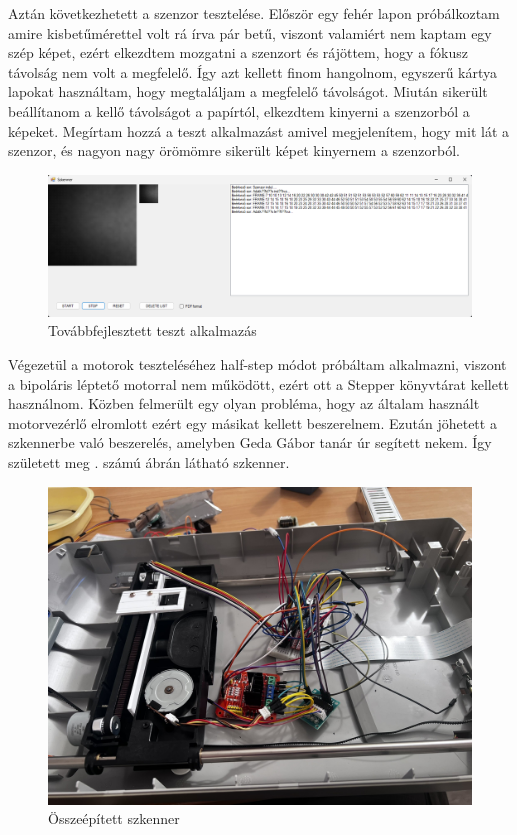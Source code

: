 \documentclass[]{thesis-ekf}
\theoremstyle{definition}
\theoremstyle{remark}
\begin{document}
Aztán következhetett a szenzor tesztelése. Először egy fehér lapon próbálkoztam amire kisbetűmérettel volt rá írva pár betű, viszont valamiért nem kaptam egy szép képet, ezért elkezdtem mozgatni a szenzort és rájöttem, hogy a fókusz távolság nem volt a megfelelő. Így azt kellett finom hangolnom, egyszerű kártya lapokat használtam, hogy megtaláljam a megfelelő távolságot. Miután sikerült beállítanom a kellő távolságot a papírtól, elkezdtem kinyerni a szenzorból a képeket. Megírtam hozzá a teszt alkalmazást amivel megjelenítem, hogy mit lát a szenzor, és nagyon nagy örömömre sikerült képet kinyernem a szenzorból.
\begin{figure}[th!]
	\centering
	\includegraphics[width=1\linewidth]{tesztalkalmazas2}
	\caption[Teszt2]{Továbbfejlesztett teszt alkalmazás}
	\label{fig:tesztalkalmazas2}
\end{figure}

Végezetül a motorok teszteléséhez half-step módot próbáltam alkalmazni, viszont a bipoláris léptető motorral nem működött, ezért ott a Stepper\cite{stepper} könyvtárat kellett használnom. Közben felmerült egy olyan probléma, hogy az általam használt motorvezérlő elromlott ezért egy másikat kellett beszerelnem. Ezután jöhetett a szkennerbe való beszerelés, amelyben Geda Gábor tanár úr segített nekem. Így született meg . számú ábrán látható szkenner.
	\begin{figure}[th!]
		\centering
		\includegraphics[width=0.7\linewidth]{scanner}
		\caption[Összeépített szkenner]{Összeépített szkenner}
		\label{fig:scanner_prototype}
	\end{figure}
\pagebreak
\end{document}

